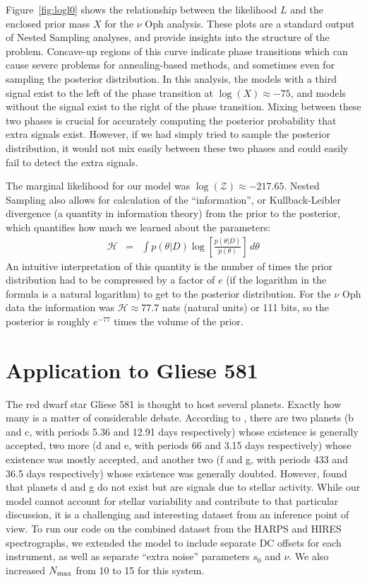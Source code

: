 \documentclass[useAMS,usenatbib]{mn2e}
\begin{document}
Figure~\ref{fig:logl0} shows the relationship between the likelihood $L$
and the enclosed prior mass $X$ for the $\nu$ Oph analysis. These plots are
a standard output of Nested Sampling analyses, and provide
insights into the structure of the problem. Concave-up regions of this curve
indicate phase transitions which can cause severe problems for annealing-based
methods, and sometimes even for sampling the posterior distribution. In this
analysis, the models with a third signal exist to the left of the phase
transition at $\log(X) \approx -75$, and models without the signal exist to the
right of the phase transition. Mixing between these two phases is crucial for
accurately computing the posterior probability that extra signals exist.
However, if we had simply tried to sample the posterior distribution, it would
not mix easily between these two phases and could easily fail to detect the
extra signals.

The marginal likelihood for our model was
$\log(\mathcal{Z}) \approx -217.65$. Nested Sampling also allows for calculation
of the ``information'', or Kullback-Leibler divergence (a quantity in information
theory) from the prior to the posterior, which quantifies how much we learned about the parameters:
\begin{eqnarray}
\mathcal{H} &=& \int p(\theta | D) \log\left[\frac{p(\theta | D)}{p(\theta)}\right] \, d\theta
\end{eqnarray}
An intuitive interpretation of this quantity is the number of times the
prior distribution had to be compressed by a factor of $e$ (if the logarithm
in the formula is a natural logarithm) to get to the posterior distribution.
For the $\nu$ Oph data the information was $\mathcal{H} \approx 77.7$ nats
(natural units) or 111 bits, so the posterior is roughly $e^{-77}$ times the
volume of the prior.

\section{Application to Gliese 581}
The red dwarf star Gliese 581 is thought to host several planets. Exactly
how many is a matter of considerable debate. According to
\citet{2014Sci...345..440R}, there are two planets
(b and c, with periods 5.36 and 12.91 days respectively)
whose existence is generally
accepted, two more
(d and e, with periods 66 and 3.15 days respectively)
whose existence was mostly accepted, and another two
(f and g, with periods 433 and 36.5 days respectively)
whose existence was generally doubted. However, \citet{2014Sci...345..440R}
found that planets d and g do not exist but are signals due to stellar activity.
While our model cannot account for stellar variability and contribute to that
particular discussion, it is a challenging and interesting dataset from an
inference point of view.
To run our code on the combined dataset from the HARPS and HIRES spectrographs,
we extended the model to include separate DC offsets for each instrument, as
well as separate ``extra noise'' parameters $s_0$ and $\nu$. We also increased
$N_{\rm max}$ from 10 to 15 for this system.
\end{document}
